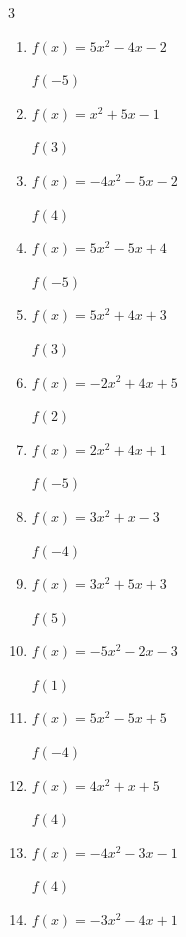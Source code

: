 \begin{multicols}{3}
\begin{enumerate}
$f(2)$
        \phantom{$= -18$}

  \item $f(x)=5x^{2}-4x-2$

$f(-5)$
        \phantom{$= 143$}

  \item $f(x)=x^{2}+5x-1$

$f(3)$
        \phantom{$= 23$}

  \item $f(x)=-4x^{2}-5x-2$

$f(4)$
        \phantom{$= -86$}

  \item $f(x)=5x^{2}-5x+4$

$f(-5)$
        \phantom{$= 154$}

  \item $f(x)=5x^{2}+4x+3$

$f(3)$
        \phantom{$= 60$}

  \item $f(x)=-2x^{2}+4x+5$

$f(2)$
        \phantom{$= 5$}

  \item $f(x)=2x^{2}+4x+1$

$f(-5)$
        \phantom{$= 31$}

  \item $f(x)=3x^{2}+x-3$

$f(-4)$
        \phantom{$= 41$}

  \item $f(x)=3x^{2}+5x+3$

$f(5)$
        \phantom{$= 103$}

  \item $f(x)=-5x^{2}-2x-3$

$f(1)$
        \phantom{$= -10$}

\columnbreak %

\resetques

  \item $f(x)=5x^{2}-5x+5$

$f(-4)$
        \phantom{$= 105$}

  \item $f(x)=4x^{2}+x+5$

$f(4)$
        \phantom{$= 73$}

  \item $f(x)=-4x^{2}-3x-1$

$f(4)$
        \phantom{$= -77$}

  \item $f(x)=-3x^{2}-4x+1$


\end{enumerate}
\end{multicols}
